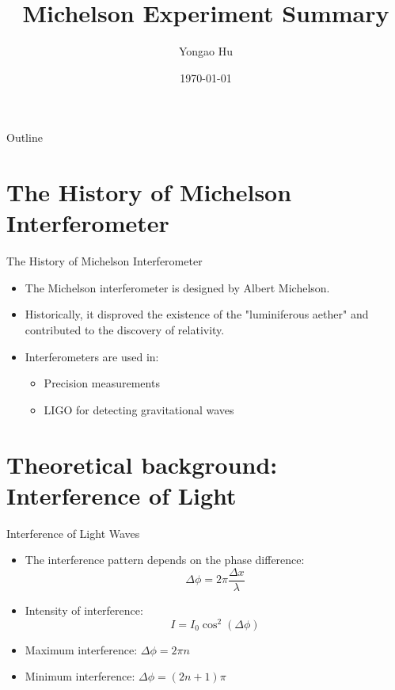 \documentclass[aspectratio = 169]{beamer}
\title{Michelson Experiment Summary}
\author{Yongao Hu}
\institute{MIT Department of Physics}
\date{\today}
\begin{document}

\begin{frame}
    \titlepage
\end{frame}

\begin{frame}{Outline}
    \tableofcontents
\end{frame}

\section{The History of Michelson Interferometer}
\begin{frame}{The History of Michelson Interferometer}
    \begin{itemize}
        \item The Michelson interferometer is designed by Albert Michelson.
        \item Historically, it disproved the existence of the "luminiferous aether" and contributed to the discovery of relativity.
        \item Interferometers are used in:
        \begin{itemize}
            \item Precision measurements
            \item LIGO for detecting gravitational waves \cite{LIGO2016}
        \end{itemize}
    \end{itemize}
\end{frame}

\section{Theoretical background: Interference of Light}
\begin{frame}{Interference of Light Waves}
    \begin{itemize}
        \item The interference pattern depends on the phase difference:
        \[
        \Delta \phi = 2\pi \frac{\Delta x}{\lambda}
        \]
        \item Intensity of interference:
        \[
        I = I_0 \cos^2(\Delta \phi)
        \]
        \item Maximum interference: $\Delta \phi = 2\pi n$
        \item Minimum interference: $\Delta \phi = (2n+1)\pi$
    \end{itemize}
\end{frame}
\end{document}
